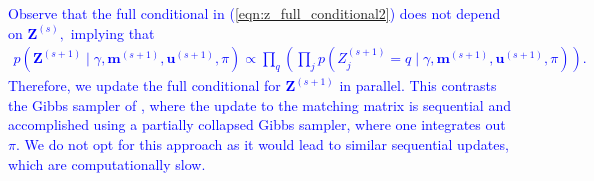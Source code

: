 \documentclass[ba]{imsart}
\begin{document}
\textcolor{blue}{Observe that the full conditional in (\ref{eqn:z_full_conditional2}) does not depend on $\bm{Z}^{(s)},$ implying that 
\begin{align}
p(\bm{Z}^{(s+1)} \mid \gamma, \bm{m}^{(s+1)}, \bm{u}^{(s+1)}, \pi) \propto \prod_q \left(\prod_j
p\left(Z_j^{(s+1)}  = q \mid \gamma, \bm{m}^{(s+1)}, \bm{u}^{(s+1)}, \pi \right)
\right).
\end{align}
Therefore, we update the full conditional for $\bm{Z}^{(s+1)}$ in parallel. This contrasts the Gibbs sampler of  \cite{sadinle_bayesian_2017}, where the update to the matching matrix is sequential and accomplished using a partially collapsed Gibbs sampler, where one integrates out $\pi.$ We do not opt for this approach as it would lead to similar sequential updates, which are computationally slow.}

\end{document}
